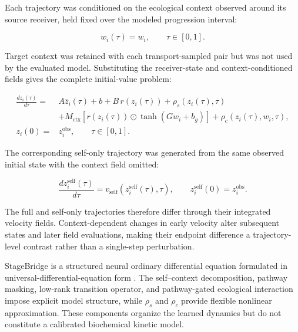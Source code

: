 Each trajectory was conditioned on the ecological context observed around its source receiver, held fixed over the modeled progression interval:

\begin{equation}
w_i(\tau)
=
w_i,
\qquad
\tau\in[0,1].
\label{eq:methods-source-fixed-context}
\end{equation}

Target context was retained with each transport-sampled pair but was not used by the evaluated model. Substituting the receiver-state and context-conditioned fields gives the complete initial-value problem:

\begin{equation}
\boxed{
\begin{aligned}
\frac{dz_i(\tau)}{d\tau}
={}&
A\overline{z}_i(\tau)
+
b
+
B\,r\!\left(z_i(\tau)\right)
+
\rho_s\!\left(z_i(\tau),\tau\right)
\\
&+
M_{\mathrm{ctx}}
\left[
r\!\left(z_i(\tau)\right)
\odot
\tanh\!\left(Gw_i+b_g\right)
\right]
+
\rho_c\!\left(z_i(\tau),w_i,\tau\right),
\\
z_i(0)
={}&
z_i^{\mathrm{obs}},
\qquad
\tau\in[0,1].
\end{aligned}
}
\label{eq:methods-stagebridge-complete}
\end{equation}

The corresponding self-only trajectory was generated from the same observed initial state with the context field omitted:

\begin{equation}
\frac{dz_i^{\mathrm{self}}(\tau)}{d\tau}
=
v_{\mathrm{self}}
\left(
z_i^{\mathrm{self}}(\tau),\tau
\right),
\qquad
z_i^{\mathrm{self}}(0)
=
z_i^{\mathrm{obs}}.
\label{eq:methods-self-ivp}
\end{equation}

The full and self-only trajectories therefore differ through their integrated velocity fields. Context-dependent changes in early velocity alter subsequent states and later field evaluations, making their endpoint difference a trajectory-level contrast rather than a single-step perturbation.

StageBridge is a structured neural ordinary differential equation formulated in universal-differential-equation form \autocite{Rackauckas2020-mc}. The self--context decomposition, pathway masking, low-rank transition operator, and pathway-gated ecological interaction impose explicit model structure, while \(\rho_s\) and \(\rho_c\) provide flexible nonlinear approximation. These components organize the learned dynamics but do not constitute a calibrated biochemical kinetic model.


